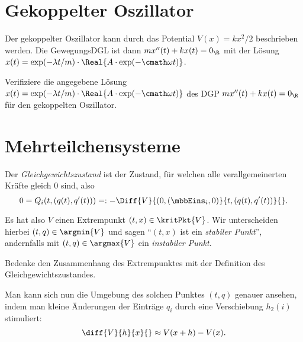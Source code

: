 \documentclass[../WiSe22ANA3.tex]{subfiles}
\begin{document}
		\section{Gekoppelter Oszillator}
			Der gekoppelter Oszillator kann durch das Potential $V(x)=kx^2/2$ beschrieben werden. Die GewegungsDGL ist dann $mx''(t)+kx(t)=0_\R$ mit der Lösung $x(t)=\exp(-\lambda t/m)\cdot\Real{A\cdot\exp(-\cmath\omega t)}$.
			
			\begin{Aufgabe}
				\nr Verifiziere die angegebene Lösung $x(t)=\exp(-\lambda t/m)\cdot\Real{A\cdot\exp(-\cmath\omega t)}$ des DGP $mx''(t)+kx(t)=0_\R$ für den gekoppelten Oszillator.
			\end{Aufgabe}
			
		\section{Mehrteilchensysteme}
			\begin{info}[Gleichgewichtszustand]
				Der \emph{Gleichgewichtszustand} ist der Zustand, für welchen alle verallgemeinerten Kräfte gleich $0$ sind, also
				$$0=Q_i(t,(q(t),q'(t)))=:-\Diff{V}{(0,(\mbbEins_i,0)}{t,(q(t),q'(t))}{}.$$
			\end{info}
			Es hat also $V$ einen Extrempunkt $(t,x)\in\kritPkt{V}$. Wir unterscheiden hierbei $(t,q)\in\argmin{V}$ und sagen \enquote{$(t,x)$ ist ein \emph{stabiler Punkt}}, andernfalls mit $(t,q)\in\argmax{V}$ ein \emph{instabiler Punkt}. 
			
			\begin{Aufgabe}
				\nr Bedenke den Zusammenhang des Extrempunktes mit der Definition des Gleichgewichtszustandes. 
			\end{Aufgabe}
			Man kann sich nun die Umgebung des solchen Punktes $(t,q)$ genauer ansehen, indem man kleine Änderungen der Einträge $q_i$ durch eine Verschiebung $h_2(i)$ stimuliert:
			$$\diff{V}{h}{x}{}\approx V(x+h)-V(x).$$
			
\end{document}
